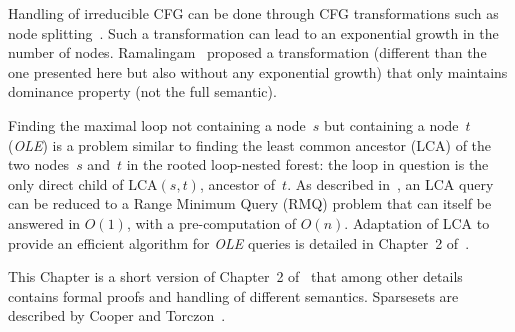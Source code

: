 Handling of irreducible CFG can be done through CFG transformations such as node splitting~\cite{JC97,aho86compilers}.
Such a transformation can lead to an exponential growth in the number of nodes.
Ramalingam~\cite{Ramalingam:2002:TOPLAS} proposed a transformation (different than the one presented here but also without any exponential growth) that only maintains dominance property (not the full semantic).

Finding the maximal loop not containing a node~$s$ but containing a node~$t$ (\textit{OLE}) is a problem similar to finding the least common ancestor (LCA) of the two nodes~$s$ and~$t$ in the rooted loop-nested forest:
the loop in question is the only direct child of $\textrm{LCA}(s,t)$, ancestor of~$t$.
As described in~\cite{BenderFC00}, an LCA query can be reduced to a Range Minimum Query (RMQ) problem that can itself be answered in $O(1)$, with a pre-computation of $O(n)$.
Adaptation of LCA to provide an efficient algorithm for \textit{OLE} queries is detailed in Chapter~2 of~\cite{rastello-hab}.

This Chapter is a short version of Chapter~2 of~\cite{rastello-hab} that among other details contains formal proofs and handling of different \phifun semantics. Sparsesets are described by Cooper and Torczon~\cite{cooper:2004:engineering}.

